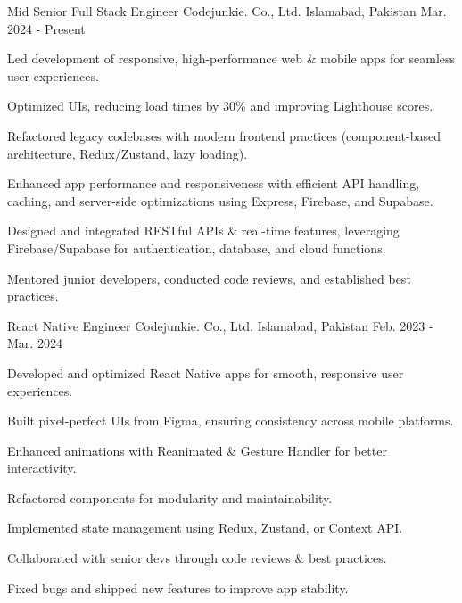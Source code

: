 

\begin{cventries}

  \cventry
    {Mid Senior Full Stack Engineer } %
    {Codejunkie. Co., Ltd.} %
    {Islamabad, Pakistan} %
    {Mar. 2024 - Present}%
    {
      \begin{cvitems} %
        \item {Led development of responsive, high-performance web \& mobile apps for seamless user experiences.}
        \item {Optimized UIs, reducing load times by 30\% and improving Lighthouse scores.}
        \item {Refactored legacy codebases with modern frontend practices (component-based architecture, Redux/Zustand, lazy loading).}
        \item {Enhanced app performance and responsiveness with efficient API handling, caching, and server-side optimizations using Express, Firebase, and Supabase.}
        \item {Designed and integrated RESTful APIs \& real-time features, leveraging Firebase/Supabase for authentication, database, and cloud functions.}
        \item {Mentored junior developers, conducted code reviews, and established best practices.}
      \end{cvitems}
    }

  \cventry
    {React Native Engineer } %
    {Codejunkie. Co., Ltd.} %
    {Islamabad, Pakistan} %
    {Feb. 2023 - Mar. 2024}%
    {
      \begin{cvitems} %
        \item {Developed and optimized React Native apps for smooth, responsive user experiences.}
        \item {Built pixel-perfect UIs from Figma, ensuring consistency across mobile platforms.}
        \item {Enhanced animations with Reanimated \& Gesture Handler for better interactivity.}
        \item {Refactored components for modularity and maintainability.}
        \item {Implemented state management using Redux, Zustand, or Context API.}
        \item {Collaborated with senior devs through code reviews \& best practices.}
        \item {Fixed bugs and shipped new features to improve app stability.}
      \end{cvitems}
    }


\end{cventries}
